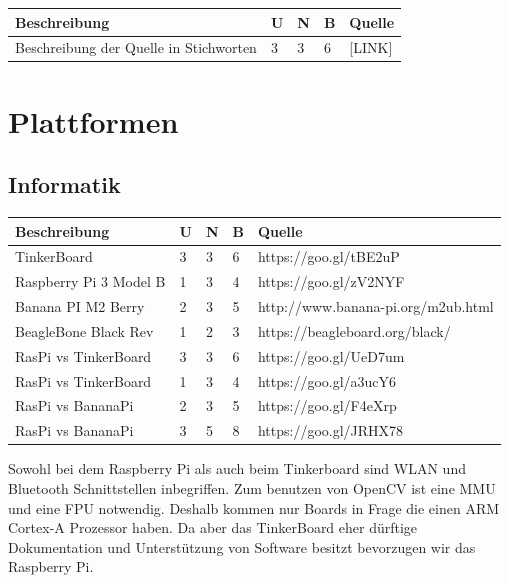 \documentclass[a4paper]{report}
\begin{document}
\vspace{1em}
\noindent
\begin{tabular}{|p{}|p{}|p{}|p{}|p{}|}
	\hline
	\textbf{Beschreibung} & \textbf{U} & \textbf{N} & \textbf{B} & \textbf{Quelle} \\
	\hline
	Beschreibung der Quelle in Stichworten & 3 & 3 & 6 & [LINK]\\
	\hline
\end{tabular}

\section{Plattformen}
\subsection{Informatik}

\vspace{1em}
\noindent
\begin{tabular}{|p{}|p{}|p{}|p{}|p{}|}
	\hline
	\textbf{Beschreibung} & \textbf{U} & \textbf{N} & \textbf{B} & \textbf{Quelle} \\
	\hline
	TinkerBoard & 3 & 3 & 6 & https://goo.gl/tBE2uP\\
	\hline
	Raspberry Pi 3 Model B & 1 & 3 & 4 & https://goo.gl/zV2NYF \\
	\hline
	Banana PI M2 Berry & 2 & 3 & 5 & http://www.banana-pi.org/m2ub.html \\
	\hline
	BeagleBone Black Rev & 1 & 2 & 3 & https://beagleboard.org/black/\\
	\hline
	RasPi vs TinkerBoard & 3 & 3 & 6 & https://goo.gl/UeD7um\\
	\hline
	RasPi vs TinkerBoard & 1 & 3 & 4 & https://goo.gl/a3ucY6\\
	\hline
	RasPi vs BananaPi & 2 & 3 & 5 & https://goo.gl/F4eXrp\\
	\hline
	RasPi vs BananaPi & 3 & 5 & 8 & https://goo.gl/JRHX78\\
	\hline
\end{tabular}

\vspace{1em}
Sowohl bei dem Raspberry Pi als auch beim Tinkerboard sind WLAN und Bluetooth
Schnittstellen inbegriffen. Zum benutzen von OpenCV ist eine MMU und eine FPU
notwendig. Deshalb kommen nur Boards in Frage die einen ARM Cortex-A Prozessor
haben. Da aber das TinkerBoard eher dürftige Dokumentation und Unterstützung von Software besitzt \parencite[Fazit]{Finnamore2017} bevorzugen wir das Raspberry Pi.
\end{document}
